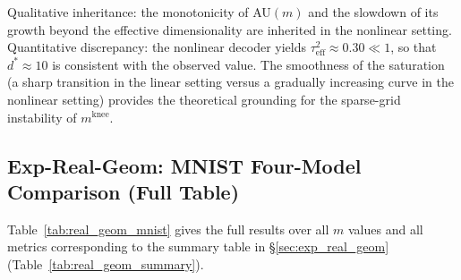 \documentclass[make,article,submit,pdftex,moreauthors]{Definitions/mdpi}
\newcommand{\mknee}{m^{\mathrm{knee}}}
\begin{document}
Qualitative inheritance: the monotonicity of AU$(m)$ and the slowdown of its growth beyond the effective dimensionality are inherited in the nonlinear setting.
Quantitative discrepancy: the nonlinear decoder yields $\tau^2_\mathrm{eff} \approx 0.30 \ll 1$, so that $d^* \approx 10$ is consistent with the observed value.
The smoothness of the saturation (a sharp transition in the linear setting versus a gradually increasing curve in the nonlinear setting) provides the theoretical grounding for the sparse-grid instability of $\mknee$.

\subsection*{Exp-Real-Geom: MNIST Four-Model Comparison (Full Table)}

Table~\ref{tab:real_geom_mnist} gives the full results over all $m$ values and
all metrics corresponding to the summary table in \S\ref{sec:exp_real_geom}
(Table~\ref{tab:real_geom_summary}).
\end{document}
